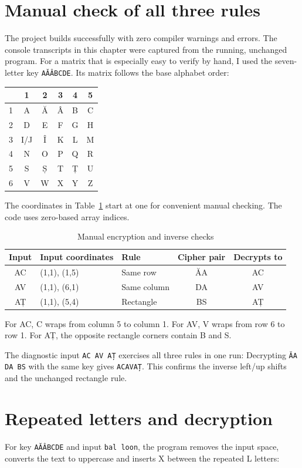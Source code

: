 \documentclass{tum_report}
\newcommand{\consolepart}[1]{{\setstretch{1}}}
\begin{document}
\section{Manual check of all three rules}
The project builds successfully with zero compiler warnings and errors.
The console transcripts in this chapter were captured from the running,
unchanged program. For a matrix that is especially easy to verify by hand,
I used the seven-letter key \texttt{AĂÂBCDE}. Its matrix follows the base
alphabet order:
\begin{center}
\begin{tabular}{c|ccccc}
 & 1 & 2 & 3 & 4 & 5\\\hline
1 & A & Ă & Â & B & C\\
2 & D & E & F & G & H\\
3 & I/J & Î & K & L & M\\
4 & N & O & P & Q & R\\
5 & S & Ș & T & Ț & U\\
6 & V & W & X & Y & Z\\
\end{tabular}\end{center}
The coordinates in Table~\ref{tab:rules} start at one for convenient manual
checking. The code uses zero-based array indices.
\begin{table}[H]\caption{Manual encryption and inverse checks}
\label{tab:rules}\centering\small
\begin{tabular}{cllcc}\toprule
Input & Input coordinates & Rule & Cipher pair & Decrypts to\\\midrule
AC & (1,1), (1,5) & Same row & ĂA & AC\\
AV & (1,1), (6,1) & Same column & DA & AV\\
AȚ & (1,1), (5,4) & Rectangle & BS & AȚ\\\bottomrule
\end{tabular}\end{table}
For AC, C wraps from column 5 to column 1. For AV, V wraps from row 6 to
row 1. For AȚ, the opposite rectangle corners contain B and S.

The diagnostic input \texttt{AC AV AȚ} exercises all three rules in one run:
\consolepart{rules_encrypt}
Decrypting \texttt{ĂA DA BS} with the same key gives \texttt{ACAVAȚ}.
This confirms the inverse left/up shifts and the unchanged rectangle rule.

\clearpage
\section{Repeated letters and decryption}
For key \texttt{AĂÂBCDE} and input \texttt{bal loon}, the program removes
the input space, converts the text to uppercase and inserts X between
the repeated L letters:
\consolepart{balloon_encrypt}
\end{document}
